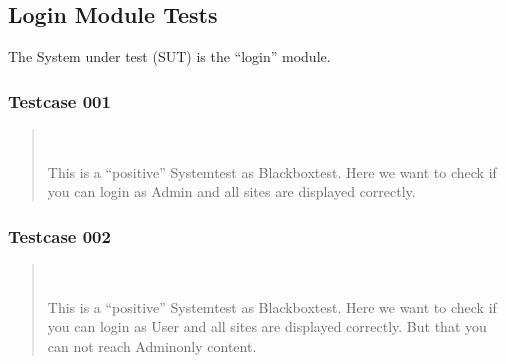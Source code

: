 \documentclass[letterpaper,10pt,english]{sphinxmanual}
\begin{document}
\subsection{Login Module Tests}
\label{\detokenize{masterCodeDoc:login-module-tests}}
The System under test (SUT) is the “login” module.


\subsubsection{Testcase 001}
\label{\detokenize{masterCodeDoc:testcase-001}}\begin{quote}


\begin{fulllineitems}
~

\begin{fulllineitems}
This is a “positive” Systemtest as Blackboxtest.
Here we want to check if you can login as Admin and all sites are displayed correctly.

\end{fulllineitems}


\end{fulllineitems}

\end{quote}


\subsubsection{Testcase 002}
\label{\detokenize{masterCodeDoc:testcase-002}}\begin{quote}


\begin{fulllineitems}
~

\begin{fulllineitems}
This is a “positive” Systemtest as Blackboxtest.
Here we want to check if you can login as User and all sites are displayed correctly.
But that you can not reach Admin\sphinxhyphen{}only content.

\end{fulllineitems}


\end{fulllineitems}

\end{quote}
\end{document}
